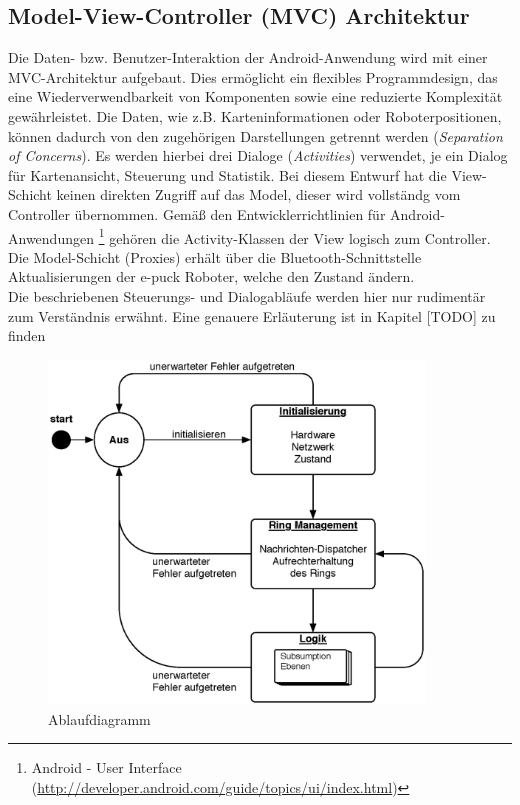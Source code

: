 \documentclass[10pt,a4paper]{article}
\begin{document}
		\subsection{Model-View-Controller (MVC) Architektur}
			Die Daten- bzw. Benutzer-Interaktion der Android-Anwendung wird mit einer MVC-Architektur aufgebaut. Dies ermöglicht ein
			flexibles Programmdesign, das eine Wiederverwendbarkeit von Komponenten sowie eine reduzierte Komplexität gewährleistet.
			Die Daten, wie z.B. Karteninformationen oder Roboterpositionen, können dadurch von den zugehörigen Darstellungen getrennt werden
			(\textit{Separation of Concerns}). Es werden hierbei drei Dialoge (\textit{Activities}) verwendet, je ein Dialog für Kartenansicht, Steuerung und
			Statistik. Bei diesem Entwurf hat die View-Schicht keinen direkten Zugriff auf das Model, dieser wird vollständg vom
			Controller übernommen. Gemäß den Entwicklerrichtlinien für Android-Anwendungen 
			\footnote{Android - User Interface (\url{http://developer.android.com/guide/topics/ui/index.html})} gehören die Activity-Klassen der
			View logisch zum	Controller. Die Model-Schicht (Proxies) erhält über die Bluetooth-Schnittstelle Aktualisierungen der e-puck Roboter,
			welche den Zustand ändern.\\
			Die beschriebenen Steuerungs- und Dialogabläufe werden hier nur rudimentär zum Verständnis erwähnt. Eine genauere Erläuterung ist in
			Kapitel [TODO] zu finden
			\begin{figure}[h]
			\centering
			\includegraphics[width=10cm]{images/e-puck.eps}
  			\caption{Ablaufdiagramm}
  			\end{figure}
  			
\end{document}

